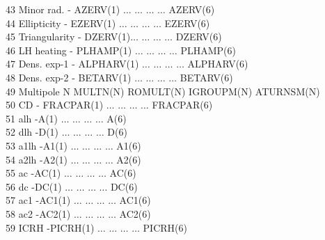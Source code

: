 \begin{tabbing}
\tiny 43 \> \tiny Minor rad. \> \tiny - \>\tiny  AZERV(1) \>$\ldots$
\>$\ldots$ \>$\ldots$ \>$\ldots$ \>\tiny AZERV(6) \\
\tiny 44 \> \tiny Ellipticity \> \tiny - \>\tiny EZERV(1) \>$\ldots$ \>$\ldots$
\>$\ldots$ \>$\ldots$ \>\tiny EZERV(6) \\
\tiny 45 \> \tiny Triangularity \> \tiny - \>\tiny DZERV(1)\>$\ldots$
\>$\ldots$ \>$\ldots$ \>$\ldots$ \>\tiny DZERV(6) \\
\tiny 46 \> \tiny LH heating \> \tiny - \>\tiny  PLHAMP(1) \>$\ldots$
\>$\ldots$ \>$\ldots$ \>$\ldots$ \>\tiny PLHAMP(6) \\
\tiny 47 \> \tiny Dens. exp-1 \> \tiny - \>\tiny  ALPHARV(1) \> $\ldots$
\> $\ldots$ \> $\ldots$ \> $\ldots$ \>\tiny ALPHARV(6) \\
\tiny 48 \> \tiny Dens. exp-2 \>\tiny - \>\tiny  BETARV(1) \> $\ldots$ \>
$\ldots$ \> $\ldots$ \> $\ldots$ \>\tiny BETARV(6) \\
\tiny 49 \> \tiny Multipole \> \tiny N \>\tiny MULTN(N) \>\tiny
ROMULT(N) \>\tiny IGROUPM(N) \> \tiny ATURNSM(N)\\
\tiny 50 \> \tiny CD \> \tiny - \>\tiny  FRACPAR(1) \> $\ldots$ \>$\ldots$
\>$\ldots$ \>$\ldots$ \>\tiny FRACPAR(6) \\
\tiny 51 \> \tiny alh \> -\>\tiny A(1) \> $\ldots$ \> $\ldots$ \> $\ldots$ \> $\ldots$
\> \tiny A(6)\\
\tiny 52 \> \tiny dlh \> -\>\tiny D(1) \> $\ldots$ \> $\ldots$ \> $\ldots$ \>
$\ldots$ \>\tiny D(6)\\
\tiny 53 \> \tiny a1lh \> -\>\tiny A1(1) \> $\ldots$ \> $\ldots$ \> $\ldots$ \>
$\ldots$ \>\tiny A1(6)\\
\tiny 54 \> \tiny a2lh \> -\>\tiny A2(1) \> $\ldots$ \> $\ldots$ \> $\ldots$ \>
$\ldots$ \>\tiny A2(6)\\
\tiny 55 \> \tiny ac \> -\>\tiny AC(1) \> $\ldots$ \> $\ldots$ \> $\ldots$ \>
$\ldots$ \>\tiny AC(6)\\
\tiny 56 \> \tiny dc \> -\>\tiny DC(1) \> $\ldots$ \> $\ldots$ \> $\ldots$ \>
$\ldots$ \>\tiny DC(6)\\
\tiny 57 \> \tiny ac1 \> -\>\tiny AC1(1) \> $\ldots$ \> $\ldots$ \> $\ldots$ \>
$\ldots$ \>\tiny AC1(6)\\
\tiny 58 \> \tiny ac2 \> -\>\tiny AC2(1) \> $\ldots$ \> $\ldots$ \> $\ldots$ \>
$\ldots$ \>\tiny AC2(6)\\
\tiny 59 \> \tiny ICRH \> -\>\tiny PICRH(1) \> $\ldots$ \> $\ldots$ \> $\ldots$
\> $\ldots$ \> \tiny PICRH(6)\\

\end{tabbing}
